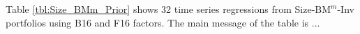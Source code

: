 
Table \ref{tbl:Size_BMm_Prior} shows 32 time series regressions from
Size-$\text{BM}^{m}$-Inv portfolios using B16 and F16 factors.
The main message of the table is ...
